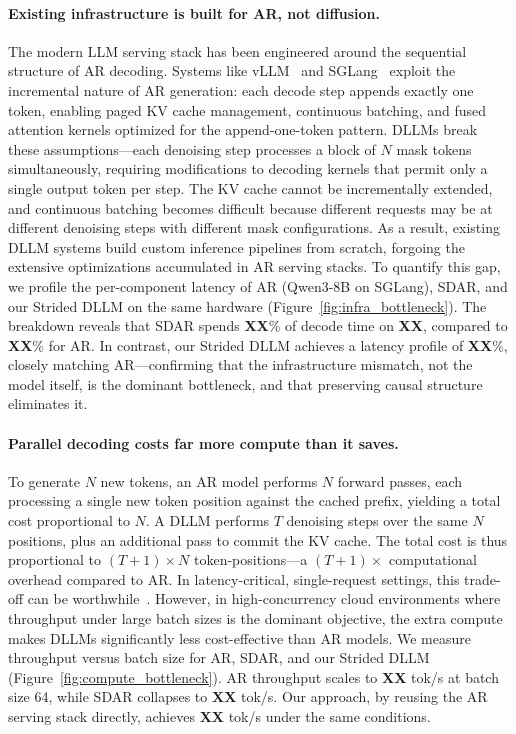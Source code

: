 \paragraph{Existing infrastructure is built for AR, not diffusion.}
The modern LLM serving stack has been engineered around the sequential structure of AR decoding. Systems like vLLM~\citep{kwon2023vllm} and SGLang~\citep{zheng2024sglang} exploit the incremental nature of AR generation: each decode step appends exactly one token, enabling paged KV cache management, continuous batching, and fused attention kernels optimized for the append-one-token pattern. DLLMs break these assumptions---each denoising step processes a block of $N$ mask tokens simultaneously, requiring modifications to decoding kernels that permit only a single output token per step. The KV cache cannot be incrementally extended, and continuous batching becomes difficult because different requests may be at different denoising steps with different mask configurations. As a result, existing DLLM systems build custom inference pipelines from scratch, forgoing the extensive optimizations accumulated in AR serving stacks. To quantify this gap, we profile the per-component latency of AR (Qwen3-8B on SGLang), SDAR, and our Strided DLLM on the same hardware (Figure~\ref{fig:infra_bottleneck}). The breakdown reveals that SDAR spends \textbf{XX}\% of decode time on \textbf{XX}, compared to \textbf{XX}\% for AR. In contrast, our Strided DLLM achieves a latency profile of \textbf{XX}\%, closely matching AR---confirming that the infrastructure mismatch, not the model itself, is the dominant bottleneck, and that preserving causal structure eliminates it.

\paragraph{Parallel decoding costs far more compute than it saves.}
To generate $N$ new tokens, an AR model performs $N$ forward passes, each processing a single new token position against the cached prefix, yielding a total cost proportional to $N$. A DLLM performs $T$ denoising steps over the same $N$ positions, plus an additional pass to commit the KV cache. The total cost is thus proportional to $(T{+}1) \times N$ token-positions---a $(T{+}1)\times$ computational overhead compared to AR. In latency-critical, single-request settings, this trade-off can be worthwhile~\citep{mercury2025, tidar2025}. However, in high-concurrency cloud environments where throughput under large batch sizes is the dominant objective, the extra compute makes DLLMs significantly less cost-effective than AR models. We measure throughput versus batch size for AR, SDAR, and our Strided DLLM (Figure~\ref{fig:compute_bottleneck}). AR throughput scales to \textbf{XX} tok/s at batch size 64, while SDAR collapses to \textbf{XX} tok/s. Our approach, by reusing the AR serving stack directly, achieves \textbf{XX} tok/s under the same conditions.
